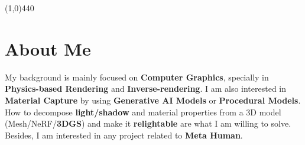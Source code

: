 \documentclass[margin,line]{resume}
\begin{document}
\begin{resume}


    



	\vspace{-5.0mm}
	\line(1,0){440}
	\vspace{-5.0mm}
	
	\section{\mysidestyle About Me}
	
	My background is mainly focused on \textbf{Computer Graphics}, specially in \textbf{Physics-based Rendering} and \textbf{Inverse-rendering}. I am also interested in \textbf{Material Capture} by using \textbf{Generative AI Models} or \textbf{Procedural Models}. How to decompose \textbf{light/shadow} and material properties from a 3D model (Mesh/NeRF/\textbf{3DGS}) and make it \textbf{relightable} are what I am willing to solve. Besides, I am interested in any project related to \textbf{Meta Human}.     


\end{resume}
\end{document}
